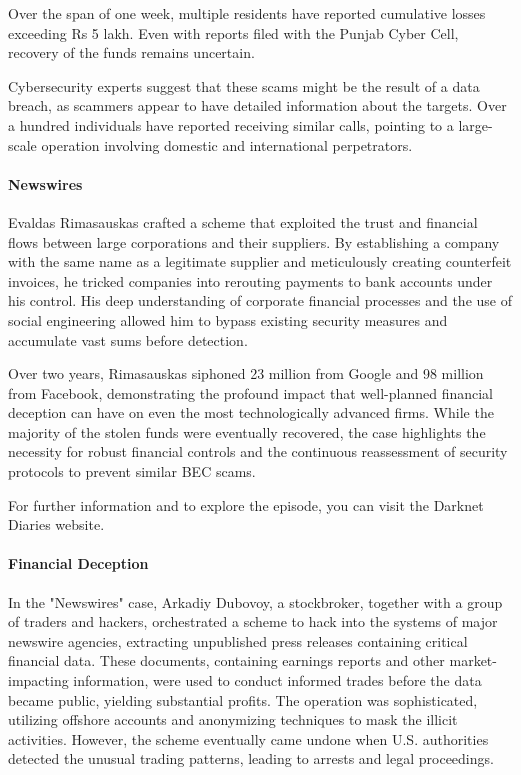 \documentclass[11pt]{article}
\begin{document}
Over the span of one week, multiple residents have reported cumulative losses exceeding Rs 5 lakh. Even with reports filed with the Punjab Cyber Cell, recovery of the funds remains uncertain.

Cybersecurity experts suggest that these scams might be the result of a data breach, as scammers appear to have detailed information about the targets. Over a hundred individuals have reported receiving similar calls, pointing to a large-scale operation involving domestic and international perpetrators.
\paragraph*{Newswires}
Evaldas Rimasauskas crafted a scheme that exploited the trust and financial flows between large corporations and their suppliers. By establishing a company with the same name as a legitimate supplier and meticulously creating counterfeit invoices, he tricked companies into rerouting payments to bank accounts under his control. His deep understanding of corporate financial processes and the use of social engineering allowed him to bypass existing security measures and accumulate vast sums before detection.

Over two years, Rimasauskas siphoned 23 million from Google and 98 million from Facebook, demonstrating the profound impact that well-planned financial deception can have on even the most technologically advanced firms. While the majority of the stolen funds were eventually recovered, the case highlights the necessity for robust financial controls and the continuous reassessment of security protocols to prevent similar BEC scams.

For further information and to explore the episode, you can visit the Darknet Diaries website.
\paragraph*{Financial Deception}
In the "Newswires" case, Arkadiy Dubovoy, a stockbroker, together with a group of traders and hackers, orchestrated a scheme to hack into the systems of major newswire agencies, extracting unpublished press releases containing critical financial data. These documents, containing earnings reports and other market-impacting information, were used to conduct informed trades before the data became public, yielding substantial profits. The operation was sophisticated, utilizing offshore accounts and anonymizing techniques to mask the illicit activities. However, the scheme eventually came undone when U.S. authorities detected the unusual trading patterns, leading to arrests and legal proceedings.
\end{document}
